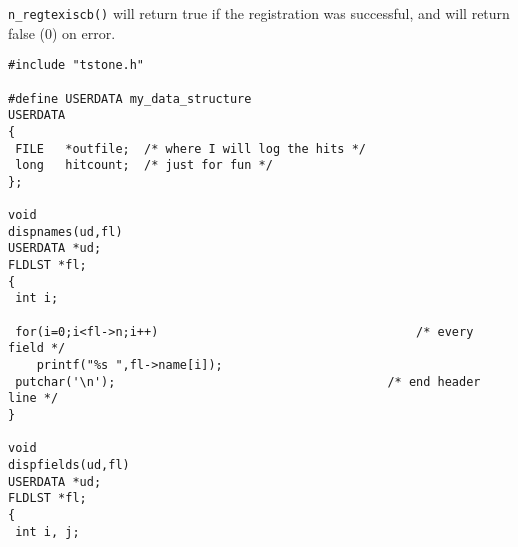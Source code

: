 \verb`n_regtexiscb()` will return true if the registration was successful,
and will return false (0) on error.

\EXAMPLE
\begin{verbatim}
#include "tstone.h"

#define USERDATA my_data_structure
USERDATA
{
 FILE   *outfile;  /* where I will log the hits */
 long   hitcount;  /* just for fun */
};

void
dispnames(ud,fl)
USERDATA *ud;
FLDLST *fl;
{
 int i;

 for(i=0;i<fl->n;i++)                                    /* every field */
    printf("%s ",fl->name[i]);
 putchar('\n');                                      /* end header line */
}

void
dispfields(ud,fl)
USERDATA *ud;
FLDLST *fl;
{
 int i, j;


\end{verbatim}
